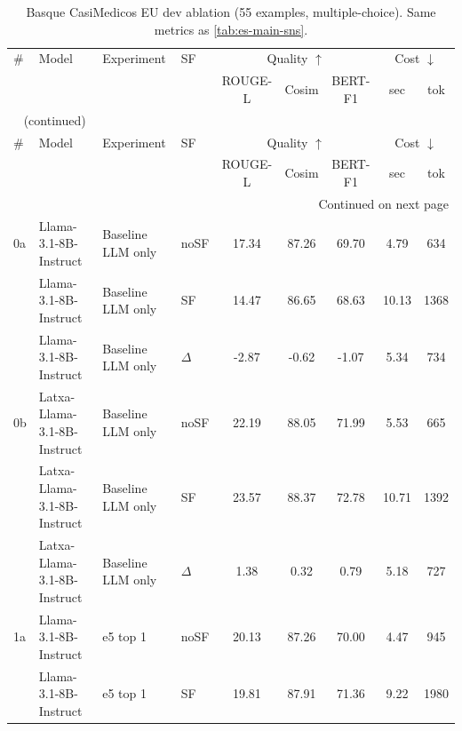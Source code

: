 \begin{scriptsize}
\setlength{\tabcolsep}{3pt}
\setlength{\LTcapwidth}{\linewidth}
\begin{longtable}{l l l l c c c c c}
\caption[Basque CasiMédicos-Arg dev ablation]{Basque CasiMedicos EU dev ablation (55 examples, multiple-choice). Same metrics as \autoref{tab:es-main-sns}.} \label{tab:eu-main-casi} \\
\toprule
\# & Model & Experiment & SF & \multicolumn{3}{c}{Quality $\uparrow$} & \multicolumn{2}{c}{Cost $\downarrow$} \\
\cmidrule(lr){5-7}\cmidrule(lr){8-9}
\multicolumn{1}{l}{} & \multicolumn{1}{l}{} & \multicolumn{1}{l}{} & \multicolumn{1}{l}{} & \multicolumn{1}{c}{ROUGE-L} & \multicolumn{1}{c}{Cosim} & \multicolumn{1}{c}{BERT-F1} & \multicolumn{1}{c}{sec} & \multicolumn{1}{c}{tok} \\
\midrule
\endfirsthead
\multicolumn{9}{l}{\tablename\ \thetable{} (continued)} \\
\toprule
\# & Model & Experiment & SF & \multicolumn{3}{c}{Quality $\uparrow$} & \multicolumn{2}{c}{Cost $\downarrow$} \\
\cmidrule(lr){5-7}\cmidrule(lr){8-9}
\multicolumn{1}{l}{} & \multicolumn{1}{l}{} & \multicolumn{1}{l}{} & \multicolumn{1}{l}{} & \multicolumn{1}{c}{ROUGE-L} & \multicolumn{1}{c}{Cosim} & \multicolumn{1}{c}{BERT-F1} & \multicolumn{1}{c}{sec} & \multicolumn{1}{c}{tok} \\
\midrule
\endhead
\midrule
\multicolumn{9}{r}{Continued on next page} \\
\endfoot
\bottomrule
\endlastfoot
0a & Llama-3.1-8B-Instruct & Baseline LLM only & noSF & 17.34 & 87.26 & 69.70 & 4.79 & 634 \\
 & Llama-3.1-8B-Instruct & Baseline LLM only & SF & 14.47 & 86.65 & 68.63 & 10.13 & 1368 \\
 & Llama-3.1-8B-Instruct & Baseline LLM only & $\Delta$ & -2.87 & -0.62 & -1.07 & 5.34 & 734 \\
0b & Latxa-Llama-3.1-8B-Instruct & Baseline LLM only & noSF & 22.19 & 88.05 & 71.99 & 5.53 & 665 \\
 & Latxa-Llama-3.1-8B-Instruct & Baseline LLM only & SF & 23.57 & 88.37 & 72.78 & 10.71 & 1392 \\
 & Latxa-Llama-3.1-8B-Instruct & Baseline LLM only & $\Delta$ & 1.38 & 0.32 & 0.79 & 5.18 & 727 \\
\dmidrule
1a & Llama-3.1-8B-Instruct & e5 top 1 & noSF & 20.13 & 87.26 & 70.00 & 4.47 & 945 \\
 & Llama-3.1-8B-Instruct & e5 top 1 & SF & 19.81 & 87.91 & 71.36 & 9.22 & 1980 \\

\end{longtable}
\end{scriptsize}
